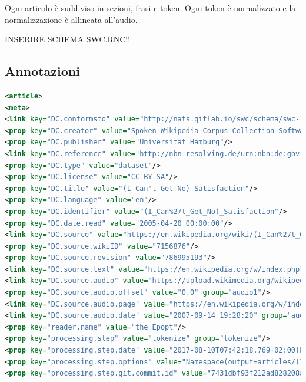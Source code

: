 \documentclass[12pt,a4paper,titlepage]{article}
\begin{document}
Ogni articolo è suddiviso in sezioni, frasi e token. Ogni token è normalizzato e la normalizzazione è allineata all'audio.

INSERIRE SCHEMA SWC.RNC!!

\subsection{Annotazioni}
\label{subsec:annotazioni}
\begin{lstlisting}[language=xml,firstnumber=1, caption=Metadati delle annotazioni delle parole in un audio, label=metadati_annotazioni,captionpos=b, basicstyle=\tiny]
<article>
<meta>
<link key="DC.conformsto" value="http://nats.gitlab.io/swc/schema/swc-1.0.rnc"/>
<prop key="DC.creator" value="Spoken Wikipedia Corpus Collection Software"/>
<prop key="DC.publisher" value="Universität Hamburg"/>
<link key="DC.reference" value="http://nbn-resolving.de/urn:nbn:de:gbv:18-228-7-2209"/>
<prop key="DC.type" value="dataset"/>
<prop key="DC.license" value="CC-BY-SA"/>
<prop key="DC.title" value="(I Can't Get No) Satisfaction"/>
<prop key="DC.language" value="en"/>
<prop key="DC.identifier" value="(I_Can%27t_Get_No)_Satisfaction"/>
<prop key="DC.date.read" value="2005-04-20 00:00:00"/>
<link key="DC.source" value="https://en.wikipedia.org/wiki/(I_Can%27t_Get_No)_Satisfaction"/>
<prop key="DC.source.wikiID" value="7156876"/>
<prop key="DC.source.revision" value="786995193"/>
<link key="DC.source.text" value="https://en.wikipedia.org/w/index.php?title=(I Can't Get No) Satisfaction&oldid=13424379"/>
<link key="DC.source.audio" value="https://upload.wikimedia.org/wikipedia/commons/3/38/En-%28I_Can%27t_Get_No%29_Satisfaction-article.oga" group="audio1"/>
<prop key="DC.source.audio.offset" value="0.0" group="audio1"/>
<link key="DC.source.audio.page" value="https://en.wikipedia.org/w/index.php?title=File%3aEn-(I_Can%27t_Get_No)_Satisfaction-article.oga" group="audio1"/>
<link key="DC.source.audio.date" value="2007-09-14 19:28:20" group="audio1"/>
<prop key="reader.name" value="the Epopt"/>
<prop key="processing.step" value="tokenize" group="tokenize"/>
<prop key="processing.step.date" value="2017-08-10T07:42:18.769+02:00[Europe/Berlin]" group="tokenize"/>
<prop key="processing.step.options" value="Namespace(output=articles/(I_Can%27t_Get_No)_Satisfaction/tokenized.swc, all_sections=false, null_normalize=false, raw_output=null, subparser_name=tokenize, lang=en, no_introduction=false, article_dir=articles/(I_Can%27t_Get_No)_Satisfaction)" group="tokenize"/>
<prop key="processing.step.git.commit.id" value="7431dbf93f212ad828208abaf8f518fb8de11ff3" group="tokenize"/>

\end{lstlisting}
\end{document}
